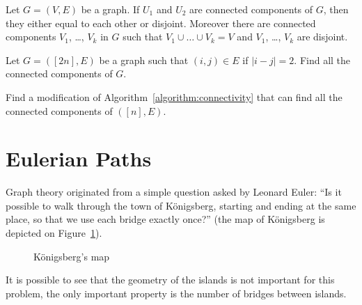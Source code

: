 \begin{theorem}
  Let $G = (V, E)$ be a graph.
  If $U_1$ and $U_2$ are connected components of $G$, then they
  either equal to each other or disjoint.
  Moreover there are connected components
  $V_1$, \dots, $V_k$ in $G$ such that $V_1 \cup \dots \cup V_k = V$
  and $V_1$, \dots, $V_k$ are disjoint.
\end{theorem}

\begin{exercise}
  Let $G = ([2n], E)$ be a graph such that $(i, j) \in E$ if $|i - j| = 2$.
  Find all the connected components of $G$.
\end{exercise}

\begin{exercise}
  Find a modification of Algorithm~\ref{algorithm:connectivity}
  that can find all the connected components of $([n], E)$.
\end{exercise}

\section{Eulerian Paths}

Graph theory originated from a simple question asked by Leonard Euler:
``Is it possible to walk through the town of K\"{o}nigsberg, starting and
ending at the same place, so that we use each bridge exactly once?'' (the map of
K\"{o}nigsberg is depicted on Figure~\ref{figure:konigsberg}).
\begin{figure}
  \begin{center}
  \end{center}
  \caption{K\"{o}nigsberg's map}
  \label{figure:konigsberg}
\end{figure}
It is possible to see that the geometry of the islands is not important for
this problem, the only important property is the number of bridges between
islands.

